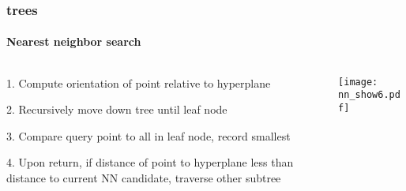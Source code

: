 \begin{frame}[noframenumbering]
  \frametitle{\kd trees}
  \framesubtitle{Nearest neighbor search}
  \begin{columns}[T]
    \begin{column}{.5\textwidth}
      \begin{block}{}%
        {\color{white} 1.\hspace{1mm} Compute orientation of point relative to hyperplane
          \\\vspace{0.4cm}
        
        2.\hspace{1mm} Recursively move down tree until leaf node\\\vspace{0.4cm}

        {\color{graph-red}
        3.\hspace{1mm} Compare query point to all in leaf node, record smallest}\\\vspace{0.4cm}
    
        4.\hspace{1mm} Upon return, if distance of point to hyperplane less than distance to current
          NN candidate, traverse other subtree}
      \end{block}
    \end{column}
    \begin{column}{.5\textwidth}
      \begin{block}{}
        \texttt{[image: nn\_show6.pdf]}
      \end{block}
    \end{column}
  \end{columns}
\end{frame}
